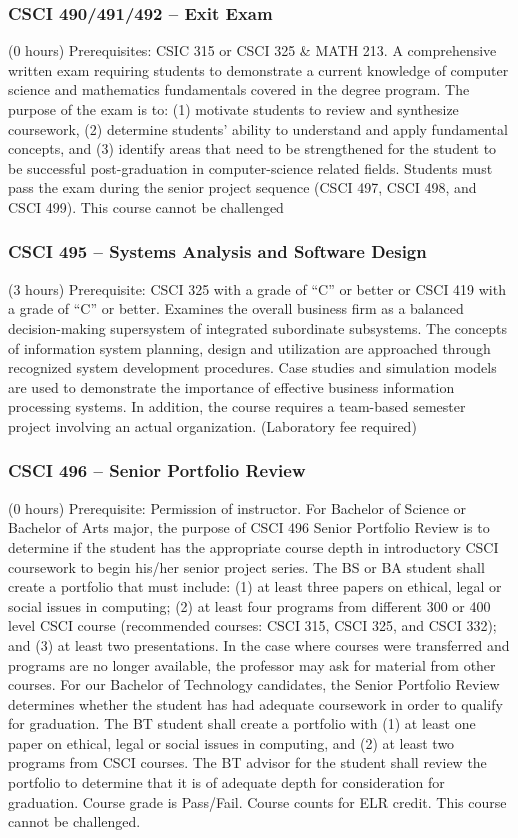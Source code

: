 \subsubsection{CSCI 490/491/492 -- Exit Exam}
(0 hours) Prerequisites: CSIC 315 or CSCI 325 \& MATH 213. A comprehensive written exam requiring students to demonstrate a current knowledge of computer science and mathematics fundamentals covered in the degree program. The purpose of the exam is to: (1) motivate students to review and synthesize coursework, (2) determine students’ ability to understand and apply fundamental concepts, and (3) identify areas that need to be strengthened for the student to be successful post-graduation in computer-science related fields. Students must pass the exam during the senior project sequence (CSCI 497, CSCI 498, and CSCI 499). This course cannot be challenged

\subsubsection{CSCI 495 -- Systems Analysis and Software Design}
(3 hours) Prerequisite: CSCI 325 with a grade of “C” or better or CSCI 419 with a grade of “C” or better. Examines the overall business firm as a balanced decision-making supersystem of integrated subordinate subsystems. The concepts of information system planning, design and utilization are approached through recognized system development procedures. Case studies and simulation models are used to demonstrate the importance of effective business information processing systems. In addition, the course requires a team-based semester project involving an actual organization. (Laboratory fee required)

\subsubsection{CSCI 496 -- Senior Portfolio Review}
(0 hours) Prerequisite: Permission of instructor. For Bachelor of Science or Bachelor of Arts major, the purpose of CSCI 496 Senior Portfolio Review is to determine if the student has the appropriate course depth in introductory CSCI coursework to begin his/her senior project series. The BS or BA student shall create a portfolio that must include: (1) at least three papers on ethical, legal or social issues in computing; (2) at least four programs from different 300 or 400 level CSCI course (recommended courses: CSCI 315, CSCI 325, and CSCI 332); and (3) at least two presentations. In the case where courses were transferred and programs are no longer available, the professor may ask for material from other courses. For our Bachelor of Technology candidates, the Senior Portfolio Review determines whether the student has had adequate coursework in order to qualify for graduation. The BT student shall create a portfolio with (1) at least one paper on ethical, legal or social issues in computing, and (2) at least two programs from CSCI courses. The BT advisor for the student shall review the portfolio to determine that it is of adequate depth for consideration for graduation. Course grade is Pass/Fail. Course counts for ELR credit. This course cannot be challenged.

